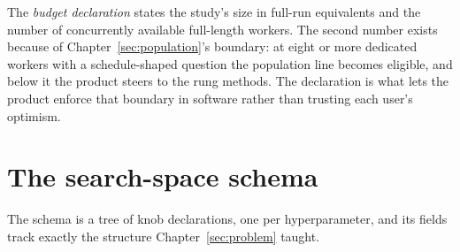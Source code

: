 The \emph{budget declaration} states the study's size in full-run
equivalents and the number of concurrently available full-length
workers. The second number exists because of
Chapter~\ref{sec:population}'s boundary: at eight or more dedicated
workers with a schedule-shaped question the population line becomes
eligible, and below it the product steers to the rung methods. The
declaration is what lets the product enforce that boundary in
software rather than trusting each user's optimism.

\section{The search-space schema}

The schema is a tree of knob declarations, one per hyperparameter,
and its fields track exactly the structure
Chapter~\ref{sec:problem} taught.

